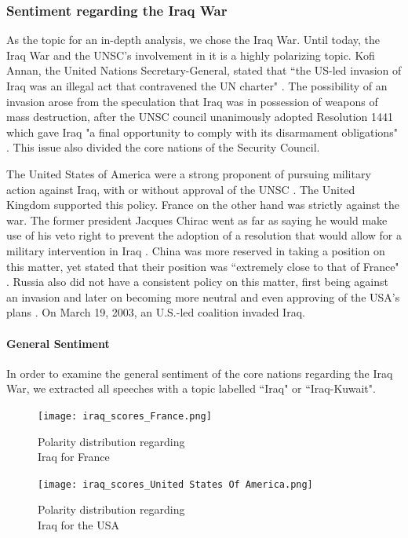 \subsubsection{Sentiment regarding the Iraq War}
As the topic for an in-depth analysis, we chose the Iraq War. Until today, the Iraq War and the UNSC's involvement in it is a highly polarizing topic. Kofi Annan, the United Nations Secretary-General, stated that ``the US-led invasion of Iraq was an illegal act that contravened the UN charter" \citep{bbciraq}.
The possibility of an invasion arose from the speculation that Iraq was in possession of weapons of mass destruction, after the UNSC council unanimously adopted Resolution 1441 which gave Iraq "a final opportunity to comply with its disarmament obligations" \citep{resolution1441}.
This issue also divided the core nations of the Security Council.

The United States of America were a strong proponent of pursuing military action against Iraq, with or without approval of the UNSC \citep{usairaq}. The United Kingdom supported this policy.
France on the other hand was strictly against the war. The former president Jacques Chirac went as far as saying he would make use of his veto right to prevent the adoption of a resolution that would allow for a military intervention in Iraq \citep{nyt}.
China was more reserved in taking a position on this matter, yet stated that their position was ``extremely close to that of France" \citep{cnn}. Russia also did not have a consistent policy on this matter, first being against an invasion and later on becoming more neutral and even approving of the USA's plans \citep{russiairaq}.
On March 19, 2003, an U.S.-led coalition invaded Iraq.

\vspace{-5pt}
\paragraph{General Sentiment}
In order to examine the general sentiment of the core nations regarding the Iraq War, we extracted all speeches with a topic labelled ``Iraq" or ``Iraq-Kuwait". 

\begin{figure}[t!]
    \centering
    \begin{minipage}{0.47\textwidth}
        \centering
        \texttt{[image: iraq\_scores\_France.png]} %
        \caption{Polarity distribution regarding \\ Iraq for France}
        \label{iraqfr}
    \end{minipage}\hfill
    \begin{minipage}{0.47\textwidth}
        \centering
        \texttt{[image: iraq\_scores\_United States Of America.png]} %
        \caption{Polarity distribution regarding \\ Iraq for the USA}
        \label{iraqusa}
    \end{minipage}
\end{figure}

